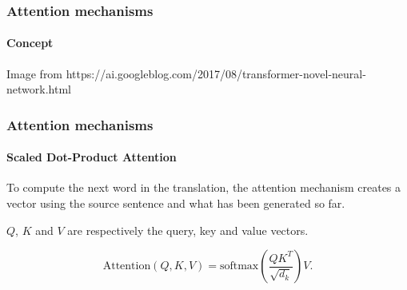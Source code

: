 \documentclass[9pt]{beamer}
\begin{document}
\begin{frame}
  \frametitle{Attention mechanisms}

  \framesubtitle{Concept}

  \begin{figure}

  \end{figure}

  {\tiny Image from https://ai.googleblog.com/2017/08/transformer-novel-neural-network.html}
\end{frame}

\begin{frame}

  \frametitle{Attention mechanisms}

  \framesubtitle{Scaled Dot-Product Attention}

  \begin{figure}
    \scalebox{0.85}{
      
    }
  \end{figure}

  \medskip

  To compute the next word in the translation, the attention mechanism
  creates a vector using the source sentence and what has been
  generated so far.

  \medskip

  $Q$, $K$ and $V$ are respectively the query, key and value vectors.

  \bigskip

  \[
  \text{Attention}(Q, K, V) = \text{softmax}(\frac{QK^{T}}{\sqrt{d_{k}}}) V.
  \]

\end{frame}
\end{document}
